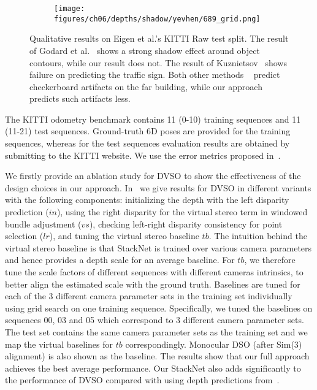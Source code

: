 \documentclass[runningheads]{llncs}
\begin{document}
\begin{figure}[tb]
\begin{subfigure}[t]{.24\textwidth}
	\end{subfigure}
	\begin{subfigure}[t]{.24\textwidth}
		\centering
		\texttt{[image: figures/ch06/depths/shadow/yevhen/689\_grid.png]}
	\end{subfigure}
	\caption{Qualitative results on Eigen et al.'s KITTI Raw test split. The result of Godard et 
		al.~\cite{godard2016unsupervised} shows a strong shadow effect around 
		object 
		contours, while our result does not. The result of 
		Kuznietsov~\cite{kuznietsov2017semi} shows failure on predicting the 
		traffic sign. Both other methods ~\cite{godard2016unsupervised,kuznietsov2017semi} 
		predict 
		checkerboard artifacts on the far 
		building, while our approach predicts such artifacts less.}
	\label{fig:shadow}
\end{figure}%
The KITTI odometry benchmark contains 11 (0-10)
training sequences and 11 (11-21) test sequences. Ground-truth 6D poses are 
provided for the training sequences, whereas for the test sequences evaluation results
are obtained by submitting to the KITTI website. 
We use the error metrics proposed in~\cite{Geiger2013IJRR}.

We firstly provide an ablation study for DVSO to show the effectiveness 
of the design choices in our approach. 
In~ we give results for DVSO in different variants with the following components:
initializing the depth with the left disparity prediction ($in$), using the right disparity for the virtual 
stereo term in windowed bundle adjustment ($vs$), checking left-right disparity consistency for point selection ($lr$),
and tuning the virtual stereo baseline $tb$.
The intuition behind the virtual stereo baseline is that StackNet is trained over various 
camera parameters and hence provides a depth scale for an average baseline.
For $tb$, we therefore tune the scale factors of different sequences with different cameras intrinsics, to better align the estimated scale with the
ground truth.
Baselines are tuned for each of the 3 different camera 
parameter sets 
in the training set individually using grid search on one training sequence. 
Specifically, we tuned the baselines on sequences 00, 03 and 05 which 
correspond to 3 different camera parameter sets. The test set 
contains the same camera parameter sets as the training 
set and we map the virtual baselines for $tb$ correspondingly. Monocular DSO 
(after Sim(3) alignment) is also 
shown as the baseline. 
The results show that our full approach achieves the 
best average performance.
Our StackNet also adds significantly to the performance of DVSO compared with 
using depth predictions from~\cite{godard2016unsupervised}.
\end{document}
